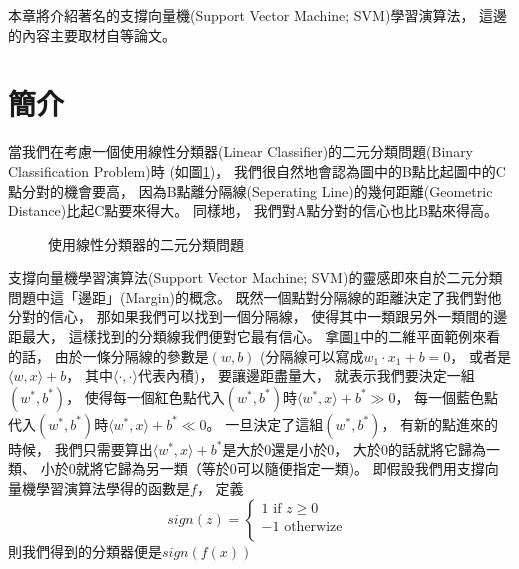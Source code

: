 本章將介紹著名的支撐向量機(Support Vector Machine; SVM)學習演算法，
這邊的內容主要取材自\cite{VapnikSVM, Burges98tutorial}等論文。

\section{簡介}  
  當我們在考慮一個使用線性分類器(Linear Classifier)的二元分類問題(Binary Classification Problem)時
  (如圖\ref{fig:svm_intro_example})，
  我們很自然地會認為圖中的B點比起圖中的C點分對的機會要高，
  因為B點離分隔線(Seperating Line)的幾何距離(Geometric Distance)比起C點要來得大。
  同樣地，
  我們對A點分對的信心也比B點來得高。
  \begin{figure}  
    \begin{center}
    \end{center}
    \caption{使用線性分類器的二元分類問題} 
    \label{fig:svm_intro_example}
  \end{figure}      

  支撐向量機學習演算法(Support Vector Machine; SVM)的靈感即來自於二元分類問題中這「邊距」(Margin)的概念。
  既然一個點對分隔線的距離決定了我們對他分對的信心，
  那如果我們可以找到一個分隔線，
  使得其中一類跟另外一類間的邊距最大，
  這樣找到的分類線我們便對它最有信心。
  拿圖\ref{fig:svm_intro_example}中的二維平面範例來看的話，
  由於一條分隔線的參數是$(w, b)$
  (分隔線可以寫成$w_1 \cdot x_1 + b = 0$，
  或者是$\langle w, x \rangle + b$，
  其中$\langle \cdot, \cdot \rangle$代表內積)，
  要讓邊距盡量大，
  就表示我們要決定一組$(w^{*}, b^{*})$，
  使得每一個紅色點代入$(w^{*}, b^{*})$時$\langle w^{*}, x \rangle + b^{*} \gg 0$，
  每一個藍色點代入$(w^{*}, b^{*})$時$\langle w^{*}, x \rangle + b^{*} \ll 0$。
  一旦決定了這組$(w^{*}, b^{*})$，
  有新的點進來的時候，
  我們只需要算出$\langle w^{*}, x \rangle + b^{*}$是大於0還是小於0，
  大於0的話就將它歸為一類、
  小於0就將它歸為另一類（等於0可以隨便指定一類)。
  即假設我們用支撐向量機學習演算法學得的函數是$f$，
  定義
  \begin{equation}
    sign(z) = 
    \left\{ 
      \begin{array}{l}
      1 \text{ if } z \geq 0 \\
      -1 \text{ otherwize } \\
      \end{array}
    \right.	
  \end{equation}
  則我們得到的分類器便是$sign(f(x))$

